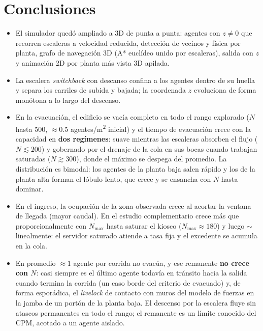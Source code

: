 \documentclass[11pt,a4paper]{article}
\begin{document}
\section{Conclusiones}
\label{sec:conclusiones}

\begin{itemize}
  \item El simulador quedó ampliado a 3D de punta a punta: agentes con $z\neq 0$ que recorren
  escaleras a velocidad reducida, detección de vecinos y física por planta, grafo de navegación
  3D (A* euclídeo unido por escaleras), salida con $z$ y animación 2D por planta más vista 3D
  apilada.
  \item La escalera \emph{switchback} con descanso confina a los agentes dentro de su huella y
  separa los carriles de subida y bajada; la coordenada $z$ evoluciona de forma monótona a lo
  largo del descenso.
  \item En la evacuación, el edificio se vacía completo en todo el rango explorado
  ($N$ hasta $500$, $\approx$0.5 agentes/\si{\metre\squared} inicial) y el tiempo de evacuación
  crece con la capacidad en \textbf{dos regímenes}: suave mientras las escaleras absorben el
  flujo ($N\lesssim 200$) y gobernado por el drenaje de la cola en sus bocas cuando trabajan
  saturadas ($N\gtrsim 300$), donde el máximo se despega del promedio. La distribución es
  bimodal: los agentes de la planta baja salen rápido y los de la planta alta forman el
  lóbulo lento, que crece y se ensancha con $N$ hasta dominar.
  \item En el ingreso, la ocupación de la zona observada crece al acortar la ventana de llegada
  (mayor caudal). En el estudio complementario crece más que proporcionalmente con $N_{\max}$
  hasta saturar el kiosco ($N_{\max}\approx 180$) y luego $\sim$linealmente: el servidor
  saturado atiende a tasa fija y el excedente se acumula en la cola.
  \item En promedio $\approx 1$ agente por corrida no evacúa, y ese remanente \textbf{no crece
  con $N$}: casi siempre es el último agente todavía en tránsito hacia la salida cuando termina
  la corrida (un caso borde del criterio de evacuado) y, de forma esporádica, el \emph{livelock}
  de contacto con muros del modelo de fuerzas en la jamba de un portón de la planta baja. El
  descenso por la escalera fluye sin atascos permanentes en todo el rango; el remanente es un
  límite conocido del CPM, acotado a un agente aislado.
\end{itemize}
\end{document}
